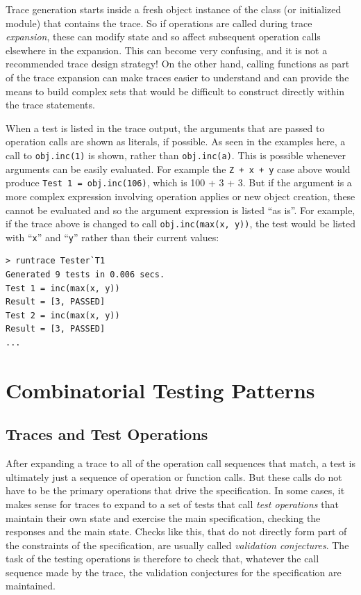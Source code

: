 \documentclass{overturerepchap}
\begin{document}
Trace generation starts inside a fresh object instance of the class (or
initialized module) that contains the trace. So if operations are called during
trace \emph{expansion}, these can modify state and so affect subsequent
operation calls elsewhere in the expansion. This can become very confusing, and
it is not a recommended trace design strategy! On the other hand, calling
functions as part of the trace expansion can make traces easier to understand
and can provide the means to build complex sets that would be difficult to
construct directly within the trace statements.

When a test is listed in the trace output, the arguments that are passed to
operation calls are shown as literals, if possible. As seen in the examples
here, a call to \texttt{obj.inc(1)} is shown, rather than \texttt{obj.inc(a)}. This is
possible whenever arguments can be easily evaluated. For example the \texttt{Z
+ x + y} case above would produce \texttt{Test 1 = obj.inc(106)}, which is 100 +
3 + 3. But if the argument is a more complex expression involving operation
applies or new object creation, these cannot be evaluated and so the argument
expression is listed ``as is''. For example, if the trace above is changed to
call \texttt{obj.inc(max(x, y))}, the test would be listed with ``\texttt{x}''
and ``\texttt{y}'' rather than their current values:

\small
\lstset{style=tool,language=}
\begin{lstlisting}[escapechar=@]
> runtrace Tester`T1
Generated 9 tests in 0.006 secs. 
Test 1 = inc(max(x, y))
Result = [3, PASSED]
Test 2 = inc(max(x, y))
Result = [3, PASSED]
...
\end{lstlisting}
\lstset{style=mystyle}
\lstset{language=VDM++}
\normalsize

\chapter{Combinatorial Testing Patterns}
\label{chap:patterns}

\section{Traces and Test Operations}

After expanding a trace to all of the operation call sequences that match, a
test is ultimately just a sequence of operation or function calls. But these
calls do not have to be the primary operations that drive the specification. In
some cases, it makes sense for traces to expand to a set of tests that call
\emph{test operations} that maintain their own state and exercise the main
specification, checking the responses and the main state. Checks like this, that
do not directly form part of the constraints of the specification, are usually
called \emph{validation conjectures}. The task of the testing operations is
therefore to check that, whatever the call sequence made by the trace, the
validation conjectures for the specification are maintained.
\end{document}
